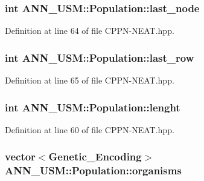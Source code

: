 \hypertarget{class_a_n_n___u_s_m_1_1_population_a2c53f59115f21a4b42e91f8aca35cdcf}{
\subsubsection[{last\-\_\-node}]{\setlength{\rightskip}{0pt plus 5cm}int A\-N\-N\-\_\-\-U\-S\-M\-::\-Population\-::last\-\_\-node}}\label{class_a_n_n___u_s_m_1_1_population_a2c53f59115f21a4b42e91f8aca35cdcf}


Definition at line 64 of file C\-P\-P\-N-\/\-N\-E\-A\-T.\-hpp.

\hypertarget{class_a_n_n___u_s_m_1_1_population_a158d58cd6154506562b3a4b4cc563034}{
\subsubsection[{last\-\_\-row}]{\setlength{\rightskip}{0pt plus 5cm}int A\-N\-N\-\_\-\-U\-S\-M\-::\-Population\-::last\-\_\-row}}\label{class_a_n_n___u_s_m_1_1_population_a158d58cd6154506562b3a4b4cc563034}


Definition at line 65 of file C\-P\-P\-N-\/\-N\-E\-A\-T.\-hpp.

\hypertarget{class_a_n_n___u_s_m_1_1_population_a9a9980d69d2a013d4dfc1388b7d96db6}{
\subsubsection[{lenght}]{\setlength{\rightskip}{0pt plus 5cm}int A\-N\-N\-\_\-\-U\-S\-M\-::\-Population\-::lenght}}\label{class_a_n_n___u_s_m_1_1_population_a9a9980d69d2a013d4dfc1388b7d96db6}


Definition at line 60 of file C\-P\-P\-N-\/\-N\-E\-A\-T.\-hpp.

\hypertarget{class_a_n_n___u_s_m_1_1_population_a98468ee8221857cad41ae4d7b2ae01cf}{
\subsubsection[{organisms}]{\setlength{\rightskip}{0pt plus 5cm}vector$<${\bf Genetic\-\_\-\-Encoding}$>$ A\-N\-N\-\_\-\-U\-S\-M\-::\-Population\-::organisms}}\label{class_a_n_n___u_s_m_1_1_population_a98468ee8221857cad41ae4d7b2ae01cf}


